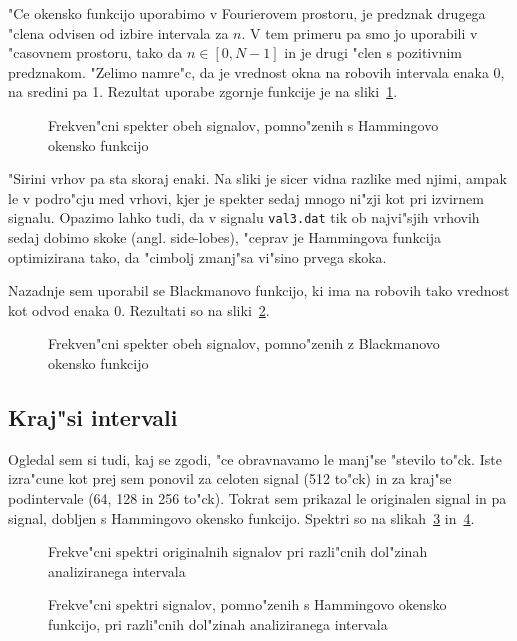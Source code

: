 \documentclass[a4paper,10pt]{article}
\begin{document}
"Ce okensko funkcijo uporabimo v Fourierovem prostoru, je predznak drugega "clena odvisen od izbire intervala za $n$. V tem primeru pa smo jo uporabili v "casovnem prostoru, tako da $n \in [0,N-1]$ in je drugi "clen s pozitivnim predznakom. "Zelimo namre"c, da je vrednost okna na robovih intervala enaka 0, na sredini pa 1.  Rezultat uporabe zgornje funkcije je na sliki~\ref{fig:val-hamm}. 

\begin{figure}[h]
 
\caption{Frekven"cni spekter obeh signalov, pomno"zenih s Hammingovo okensko funkcijo}
\label{fig:val-hamm}
\end{figure}

"Sirini vrhov pa sta skoraj enaki. Na sliki je sicer vidna razlike med njimi, ampak le v podro"cju med vrhovi, kjer je spekter sedaj mnogo ni"zji kot pri izvirnem signalu. Opazimo lahko tudi, da v signalu \texttt{val3.dat} tik ob najvi"sjih vrhovih sedaj dobimo skoke (angl. side-lobes), "ceprav je Hammingova funkcija optimizirana tako, da "cimbolj zmanj"sa vi"sino prvega skoka. 

Nazadnje sem uporabil se Blackmanovo funkcijo, ki ima na robovih tako vrednost kot odvod enaka 0. Rezultati so na sliki~\ref{fig:val-black}. 

\begin{figure}[h]
 
\caption{Frekven"cni spekter obeh signalov, pomno"zenih z Blackmanovo okensko funkcijo}
\label{fig:val-black}
\end{figure}

\cleardoublepage
\subsection{Kraj"si intervali}

Ogledal sem si tudi, kaj se zgodi, "ce obravnavamo le manj"se "stevilo to"ck. Iste izra"cune kot prej sem ponovil za celoten signal (512 to"ck) in za kraj"se podintervale (64, 128 in 256 to"ck). Tokrat sem prikazal le originalen signal in pa signal, dobljen s Hammingovo okensko funkcijo. Spektri so na slikah~\ref{fig:val-dolzina} in~\ref{fig:val-dolzina-hamm}. 

\begin{figure}[h]
 \subfigure[$M = 64$]{} 
 \subfigure[$M = 128$]{}
 \subfigure[$M = 256$]{}
 \subfigure[$M = 512$]{}
\caption{Frekve"cni spektri originalnih signalov pri razli"cnih dol"zinah analiziranega intervala}
\label{fig:val-dolzina}
\end{figure}

\begin{figure}[h]
 \subfigure[$M = 64$]{} 
 \subfigure[$M = 128$]{}
 \subfigure[$M = 256$]{}
 \subfigure[$M = 512$]{}
\caption{Frekve"cni spektri signalov, pomno"zenih s Hammingovo okensko funkcijo, pri razli"cnih dol"zinah analiziranega intervala}
\label{fig:val-dolzina-hamm}
\end{figure}
\end{document}
